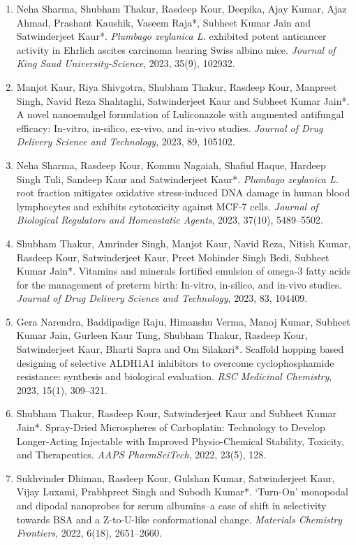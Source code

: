 \documentclass[11pt,a4paper]{article}
\begin{document}
\begin{enumerate}
  \item Neha Sharma, Shubham Thakur, Rasdeep Kour, Deepika, Ajay Kumar, Ajaz Ahmad, Prashant Kaushik, Vaseem Raja*, Subheet Kumar Jain and Satwinderjeet Kaur*. \textit{Plumbago zeylanica L.} exhibited potent anticancer activity in Ehrlich ascites carcinoma bearing Swiss albino mice. \textit{Journal of King Saud University-Science}, 2023, 35(9), 102932.
  \item Manjot Kaur, Riya Shivgotra, Shubham Thakur, Rasdeep Kour, Manpreet Singh, Navid Reza Shahtaghi, Satwinderjeet Kaur and Subheet Kumar Jain*. A novel nanoemulgel formulation of Luliconazole with augmented antifungal efficacy: In-vitro, in-silico, ex-vivo, and in-vivo studies. \textit{Journal of Drug Delivery Science and Technology}, 2023, 89, 105102.
  \item Neha Sharma, Rasdeep Kour, Kommu Nagaiah, Shafiul Haque, Hardeep Singh Tuli, Sandeep Kaur and Satwinderjeet Kaur*. \textit{Plumbago zeylanica L.} root fraction mitigates oxidative stress-induced DNA damage in human blood lymphocytes and exhibits cytotoxicity against MCF-7 cells. \textit{Journal of Biological Regulators and Homeostatic Agents}, 2023, 37(10), 5489--5502.
  \item Shubham Thakur, Amrinder Singh, Manjot Kaur, Navid Reza, Nitish Kumar, Rasdeep Kour, Satwinderjeet Kaur, Preet Mohinder Singh Bedi, Subheet Kumar Jain*. Vitamins and minerals fortified emulsion of omega-3 fatty acids for the management of preterm birth: In-vitro, in-silico, and in-vivo studies. \textit{Journal of Drug Delivery Science and Technology}, 2023, 83, 104409.
  \item Gera Narendra, Baddipadige Raju, Himanshu Verma, Manoj Kumar, Subheet Kumar Jain, Gurleen Kaur Tung, Shubham Thakur, Rasdeep Kour, Satwinderjeet Kaur, Bharti Sapra and Om Silakari*. Scaffold hopping based designing of selective ALDH1A1 inhibitors to overcome cyclophosphamide resistance: synthesis and biological evaluation. \textit{RSC Medicinal Chemistry}, 2023, 15(1), 309--321.
  \item Shubham Thakur, Rasdeep Kour, Satwinderjeet Kaur and Subheet Kumar Jain*. Spray-Dried Microspheres of Carboplatin: Technology to Develop Longer-Acting Injectable with Improved Physio-Chemical Stability, Toxicity, and Therapeutics. \textit{AAPS PharmSciTech}, 2022, 23(5), 128.
  \item Sukhvinder Dhiman, Rasdeep Kour, Gulshan Kumar, Satwinderjeet Kaur, Vijay Luxami, Prabhpreet Singh and Subodh Kumar*. `Turn-On' monopodal and dipodal nanoprobes for serum albumins--a case of shift in selectivity towards BSA and a Z-to-U-like conformational change. \textit{Materials Chemistry Frontiers}, 2022, 6(18), 2651--2660.

\end{enumerate}
\end{document}
